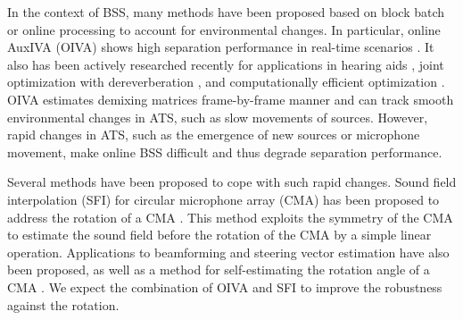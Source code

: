 \documentclass[sip,biber]{now-journal}
\begin{document}
In the context of BSS, many methods have been proposed based on block batch \cite{Koldovsky:2019:ICASSP,Koldovsky:2021:SP,Jansky:2022:ASMP} or online processing \cite{Kim:2010:CASI,Taniguchi:2014:HSCMA} to account for environmental changes.
In particular, online AuxIVA (OIVA) shows high separation performance in real-time scenarios \cite{Taniguchi:2014:HSCMA}.
It also has been actively researched recently for applications in hearing aids \cite{Sunohara:2017:ICASSP}, joint optimization with dereverberation \cite{Ueda:2021:ICASSP}, and computationally efficient optimization \cite{Nakashima:2023:ICASSP}.
OIVA estimates demixing matrices frame-by-frame manner and can track smooth environmental changes in ATS, such as slow movements of sources.
However, rapid changes in ATS, such as the emergence of new sources or microphone movement, make online BSS difficult and thus degrade separation performance.

Several methods have been proposed to cope with such rapid changes.
Sound field interpolation (SFI) for circular microphone array (CMA) has been proposed to address the rotation of a CMA \cite{Wakabayashi:2023:ASLP}.
This method exploits the symmetry of the CMA to estimate the sound field before the rotation of the CMA by a simple linear operation.
Applications to beamforming \cite{Wakabayashi:2021:ICASSP} and steering vector estimation \cite{Wakabayashi:2021:ASJ:A} have also been proposed,
as well as a method for self-estimating the rotation angle of a CMA \cite{Lian:2021:APSIPA}.
We expect the combination of OIVA and SFI to improve the robustness against the rotation.
\end{document}
